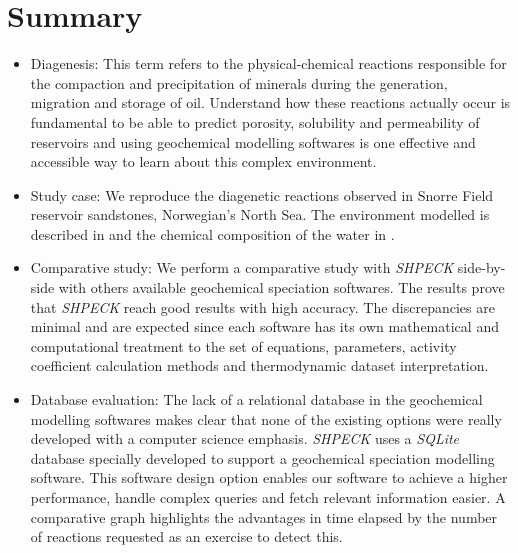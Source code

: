 \newpage
\section{Summary}
\begin{itemize}
    \item Diagenesis: This term refers to the physical-chemical reactions responsible for the compaction and precipitation of minerals  during the generation, migration and storage of oil. Understand how these reactions actually occur is fundamental to be able to predict porosity, solubility and permeability of reservoirs and using geochemical modelling softwares is one effective and accessible way to learn about this complex environment.
    \item Study case: We reproduce the diagenetic reactions observed in Snorre Field reservoir sandstones, Norwegian's North Sea. The environment modelled is described in \cite{Morad:90} and the chemical composition of the water in \cite{Nordstrom:79}.
    \item Comparative study: We perform a comparative study with \emph{SHPECK} side-by-side with others available geochemical speciation softwares. The results prove that \emph{SHPECK} reach good results with high accuracy. The discrepancies are minimal and are expected since each software has its own mathematical and computational treatment to the set of equations, parameters, activity coefficient calculation methods and thermodynamic dataset interpretation. 
    \item Database evaluation: The lack of a relational database in the geochemical modelling softwares makes clear that none of the existing options were really developed with a computer science emphasis. \emph{SHPECK} uses a \emph{SQLite} database specially developed to support a geochemical speciation modelling software. This software design option enables our software to achieve a higher performance, handle complex queries and fetch relevant information easier. A comparative graph highlights the advantages in time elapsed by the number of reactions requested as an exercise to detect this.
\end{itemize}